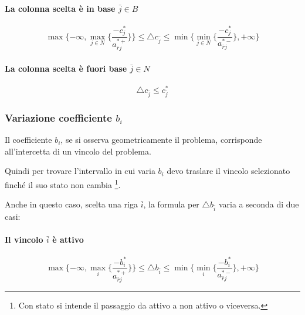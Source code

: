 \paragraph{La colonna scelta è in base $\bar{j} \in B$}

\begin{equation} \label{variazioneC}
	\max \lbrace- \infty, \max_{j \in N} \lbrace \frac{-c_j^*}{a_{\bar{r}j}^{*+}} \rbrace \rbrace \leq \triangle c_{\bar{j}} \leq \min \lbrace \min_{j \in N} \lbrace \frac{-c_j^*}{a_{\bar{r}j}^{*-}} \rbrace,+ \infty \rbrace
\end{equation}

\paragraph{La colonna scelta è fuori base $\bar{j} \in N$}

\begin{equation}
	\triangle c_{\bar{j}} \leq c_{\bar{j}}^*
\end{equation}



\subsubsection{Variazione coefficiente $b_i$}
Il coefficiente $b_i$, se si osserva geometricamente il problema, corrisponde all'intercetta di un vincolo del problema. 

Quindi per trovare l'intervallo in cui varia $b_i$ devo traslare il vincolo selezionato finché il suo stato non cambia \footnote{Con stato si intende il passaggio da attivo a non attivo o viceversa.}.

Anche in questo caso, scelta una riga $\bar{i}$, la formula per $\triangle b_{\bar{i}}$ varia a seconda di due casi:

\paragraph{Il vincolo $\bar{i}$ è attivo}

\begin{equation} \label{variazioneB}
	\max \lbrace- \infty, \max_i \lbrace \frac{-b_i^*}{a_{\bar{r}j}^{*+}} \rbrace \rbrace \leq \triangle b_{\bar{i}} \leq \min \lbrace \min_i \lbrace \frac{-b_i^*}{a_{\bar{r}j}^{*-}} \rbrace,+ \infty \rbrace
\end{equation}

